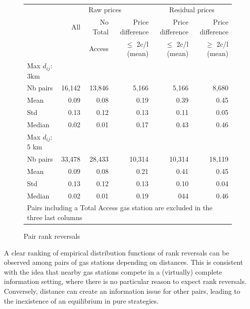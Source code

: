 \documentclass[11pt]{article}
\begin{document}
\ \\
\begin{figure}
\caption{Pair rank reversals}
\centering
\begin{tabular}{lrrrrr}
\hline
{} & \multicolumn{3}{c}{Raw prices} & \multicolumn{2}{c}{Residual prices}  \\
{} & All & No Total & Price difference & Price difference & Price difference \\
{} & {} & Access & $\le$ 2c/l (mean) & $\le$ 2c/l (mean) & $\ge$ 2c/l (mean)\\
\hline
Max $d_{ij}$: 3km & {} & {} & {} & {} & {} \\
\hline
Nb pairs & 16,142 & 13,846 & 5,166 & 5,166 & 8,680 \\
Mean & 0.09 & 0.08 & 0.19 & 0.39 & 0.45 \\
Std & 0.13 & 0.12 & 0.13 & 0.11 & 0.05 \\
Median & 0.02 & 0.01 & 0.17 & 0.43 & 0.46 \\
\hline
Max $d_{ij}$: 5 km & {} & {} & {} & {} & {} \\
\hline
Nb pairs & 33,478 & 28,433 & 10,314 & 10,314 & 18,119 \\
Mean & 0.09 & 0.08 & 0.21 & 0.41 & 0.45 \\
Std & 0.13 & 0.12 & 0.13 & 0.10 & 0.04 \\
Median & 0.02 & 0.01 & 0.19 & 044 & 0.46 \\
\hline
\multicolumn{6}{l}{\small Pairs including a Total Access gas station are excluded in the three last columns}\\
\end{tabular}
\end{figure}

A clear ranking of empirical distribution functions of rank reversals can be observed among pairs of gas stations depending on distances. This is consistent with the idea that nearby gas stations compete in a (virtually) complete information setting, where there is no particular reason to expect rank reversals. Conversely, distance can create an information issue for other pairs, leading to the inexistence of an equilibrium in pure strategies.
\end{document}
